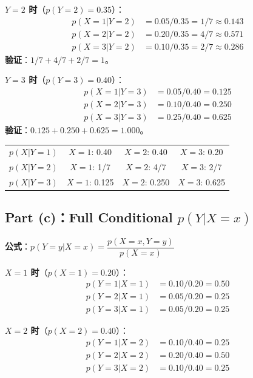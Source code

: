 \documentclass[11pt,a4paper]{article}
\begin{document}
\textbf{$Y = 2$ 时}（$p(Y\!=\!2) = 0.35$）：
\begin{align*}
p(X\!=\!1 | Y\!=\!2) &= 0.05 / 0.35 = 1/7 \approx 0.143 \\
p(X\!=\!2 | Y\!=\!2) &= 0.20 / 0.35 = 4/7 \approx 0.571 \\
p(X\!=\!3 | Y\!=\!2) &= 0.10 / 0.35 = 2/7 \approx 0.286
\end{align*}
\textbf{验证}：$1/7 + 4/7 + 2/7 = 1$。

\textbf{$Y = 3$ 时}（$p(Y\!=\!3) = 0.40$）：
\begin{align*}
p(X\!=\!1 | Y\!=\!3) &= 0.05 / 0.40 = 0.125 \\
p(X\!=\!2 | Y\!=\!3) &= 0.10 / 0.40 = 0.250 \\
p(X\!=\!3 | Y\!=\!3) &= 0.25 / 0.40 = 0.625
\end{align*}
\textbf{验证}：$0.125 + 0.250 + 0.625 = 1.000$。

\begin{center}
\begin{tabular}{c|ccc}
$p(X|Y\!=\!1)$ & $X\!=\!1$: 0.40 & $X\!=\!2$: 0.40 & $X\!=\!3$: 0.20 \\
$p(X|Y\!=\!2)$ & $X\!=\!1$: 1/7 & $X\!=\!2$: 4/7 & $X\!=\!3$: 2/7 \\
$p(X|Y\!=\!3)$ & $X\!=\!1$: 0.125 & $X\!=\!2$: 0.250 & $X\!=\!3$: 0.625
\end{tabular}
\end{center}

\subsection*{Part (c)：Full Conditional $p(Y | X = x)$}

\textbf{公式}：$p(Y\!=\!y | X\!=\!x) = \dfrac{p(X\!=\!x, Y\!=\!y)}{p(X\!=\!x)}$

\medskip
\textbf{$X = 1$ 时}（$p(X\!=\!1) = 0.20$）：
\begin{align*}
p(Y\!=\!1 | X\!=\!1) &= 0.10 / 0.20 = 0.50 \\
p(Y\!=\!2 | X\!=\!1) &= 0.05 / 0.20 = 0.25 \\
p(Y\!=\!3 | X\!=\!1) &= 0.05 / 0.20 = 0.25
\end{align*}

\textbf{$X = 2$ 时}（$p(X\!=\!2) = 0.40$）：
\begin{align*}
p(Y\!=\!1 | X\!=\!2) &= 0.10 / 0.40 = 0.25 \\
p(Y\!=\!2 | X\!=\!2) &= 0.20 / 0.40 = 0.50 \\
p(Y\!=\!3 | X\!=\!2) &= 0.10 / 0.40 = 0.25
\end{align*}
\end{document}
